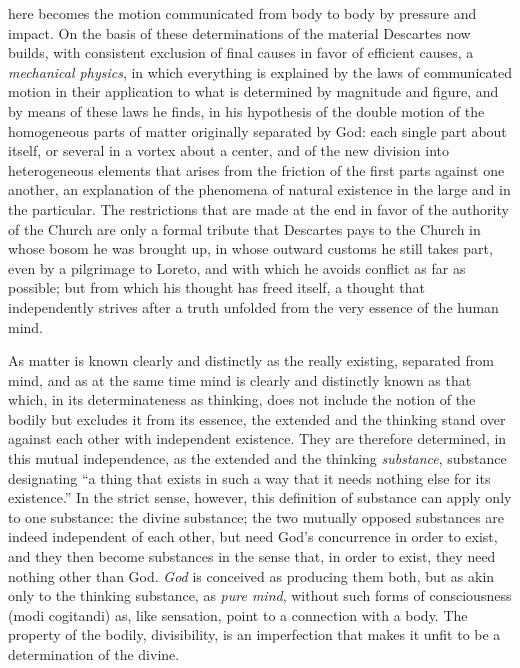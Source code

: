 here becomes the motion communicated from body to body by pressure and impact. On the basis of these determinations of the material Descartes now builds, with consistent exclusion of final causes in favor of efficient causes, a \emph{mechanical physics}, in which everything is explained by the laws of communicated motion in their application to what is determined by magnitude and figure, and by means of these laws he finds, in his hypothesis of the double motion of the homogeneous parts of matter originally separated by God: each single part about itself, or several in a vortex about a center, and of the new division into heterogeneous elements that arises from the friction of the first parts against one another, an explanation of the phenomena of natural existence in the large and in the particular. The restrictions that are made at the end in favor of the authority of the Church are only a formal tribute that Descartes pays to the Church in whose bosom he was brought up, in whose outward customs he still takes part, even by a pilgrimage to Loreto, and with which he avoids conflict as far as possible; but from which his thought has freed itself, a thought that independently strives after a truth unfolded from the very essence of the human mind.

As matter is known clearly and distinctly as the really existing, separated from mind, and as at the same time mind is clearly and distinctly known as that which, in its determinateness as thinking, does not include the notion of the bodily but excludes it from its essence, the extended and the thinking stand over against each other with independent existence. They are therefore determined, in this mutual independence, as the extended and the thinking \emph{substance}, substance designating ``a thing that exists in such a way that it needs nothing else for its existence.'' In the strict sense, however, this definition of substance can apply only to one substance: the divine substance; the two mutually opposed substances are indeed independent of each other, but need God's concurrence in order to exist, and they then become substances in the sense that, in order to exist, they need nothing other than
God. \emph{God} is conceived as producing them both, but as akin only to the thinking substance, as \emph{pure mind}, without such forms of consciousness (modi cogitandi) as, like sensation, point to a connection with a body. The property of the bodily, divisibility, is an imperfection that makes it unfit to be a determination of the divine.

